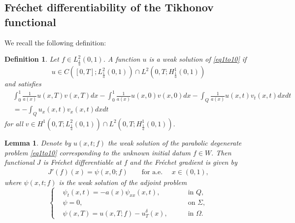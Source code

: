 \documentclass[reqno]{amsart}
\theoremstyle{plain}
\newtheorem{lemma}[theorem]{Lemma}
\newtheorem{definition}[theorem]{Definition}
\theoremstyle{remark}
\numberwithin{equation}{section}
\begin{document}
\subsection{Fréchet differentiability of the Tikhonov functional}
We recall the following definition:
\begin{definition}
    Let $f \in L^{2}_{\frac{1}{a}}(0,1)$. A function $u$ is a weak solution of \eqref{eq1to10} if 
    $$ u \in C\left([0,T];L^{2}_{\frac{1}{a}}(0,1)\right)\cap L^2\left(0,T; H^1_{\frac{1}{a}}(0,1)\right)$$
    and satisfies
\begin{equation*}
    \begin{aligned}
        &\int_{0}^1\frac{1}{a(x)}u(x,T)v(x,T) dx-\int_{0}^1\frac{1}{a(x)}u(x,0)v(x,0) dx-\int_{Q}\frac{1}{a(x)}u(x,t)v_t(x,t)dxdt\\&= -\int_{Q}u_x(x,t)v_x(x,t)dxdt
    \end{aligned}
\end{equation*}
for all $v \in H^1\left(0,T;L^{2}_{\frac{1}{a}}(0,1)\right)\cap L^2\left(0,T; H^1_{\frac{1}{a}}(0,1)\right).$
\end{definition}
\begin{lemma}
    Denote by $u(x,t;f)$ the weak solution of the parabolic degenerate problem \eqref{eq1to10} corresponding to the unknown initial datum $ f\in W.$ Then functional $J$ is Fr\'echet differentiable at $f$ and  the Fr\'echet gradient is given by
    \begin{align}\label{34}
         J'(f)(x)= \psi(x,0;f)\qquad \text{for a.e. }\quad x\in (0,1),
    \end{align}
    where $\psi(x,t;f)$ is the weak solution of the adjoint problem
    \begin{equation}
        \left\{
\begin{aligned}
& \psi_{t}(x,t) = -a(x) \psi_{xx}(x,t), &&\quad \text { in } Q,\\
& \psi=0, &&\quad \text { on } \Sigma,\\
& \psi(x,T)=u(x,T;f)-u^{\delta}_{T}(x), &&\quad \text { in } \Omega.
\label{eq1to5}
\end{aligned}
\right.
\end{equation}
\end{lemma}
\end{document}
